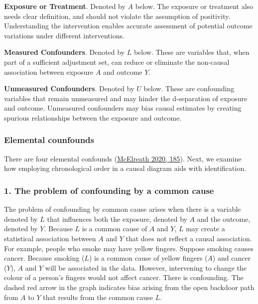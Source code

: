 \documentclass[
  singlecolumn]{article}
\begin{document}
\textbf{Exposure or Treatment}. Denoted by \(A\) below. The exposure or
treatment also needs clear definition, and should not violate the
assumption of positivity. Understanding the intervention enables
accurate assessment of potential outcome variations under different
interventions.

\textbf{Measured Confounders}. Denoted by \(L\) below. These are
variables that, when part of a sufficient adjustment set, can reduce or
eliminate the non-causal association between exposure \(A\) and outcome
\(Y\).

\textbf{Unmeasured Confounders}. Denoted by \(U\) below. These are
confounding variables that remain unmeasured and may hinder the
d-separation of exposure and outcome. Unmeasured confounders may bias
causal estimates by creating spurious relationships between the exposure
and outcome.

\hypertarget{elemental-counfounds}{%
\subsubsection{Elemental counfounds}\label{elemental-counfounds}}

There are four elemental confounds
(\protect\hyperlink{ref-mcelreath2020}{McElreath 2020, 185}). Next, we
examine how employing chronological order in a causal diagram aids with
identification.

\hypertarget{the-problem-of-confounding-by-a-common-cause}{%
\subsubsection{1. The problem of confounding by a common
cause}\label{the-problem-of-confounding-by-a-common-cause}}

The problem of confounding by common cause arises when there is a
variable denoted by \(L\) that influences both the exposure, denoted by
\(A\) and the outcome, denoted by \(Y.\) Because \(L\) is a common cause
of \(A\) and \(Y\), \(L\) may create a statistical association between
\(A\) and \(Y\) that does not reflect a causal association. For example,
people who smoke may have yellow fingers. Suppose smoking causes cancer.
Because smoking (\(L\)) is a common cause of yellow fingers (\(A\)) and
cancer (\(Y\)), \(A\) and \(Y\) will be associated in the data. However,
intervening to change the colour of a person's fingers would not affect
cancer. There is confounding. The dashed red arrow in the graph
indicates bias arising from the open backdoor path from \(A\) to \(Y\)
that results from the common cause \(L\).
\end{document}
